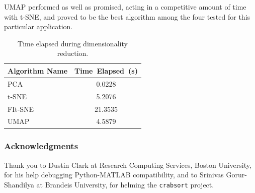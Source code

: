 \documentclass{article}
\begin{document}
UMAP performed as well as promised, acting in a competitive amount of time with t-SNE,
and proved to be the best algorithm among the four tested for this particular application.

\begin{table}
  \caption{Time elapsed during dimensionality reduction.}
  \label{tbl:dim-red-time}
  \centering
  \begin{tabular}{lS}
    \toprule
    Algorithm Name     & Time~Elapsed~(s) \\
    \midrule
    PCA     & 0.0228 \\
    t-SNE   & 5.2076 \\
    FIt-SNE & 21.3535 \\
    UMAP    & 4.5879 \\
    \bottomrule
  \end{tabular}
\end{table}

\subsubsection*{Acknowledgments}

Thank you to Dustin Clark at Research Computing Services, Boston University,
for his help debugging Python-MATLAB compatibility,
and to Srinivas Gorur-Shandilya at Brandeis University,
for helming the \texttt{crabsort} project.
%
%
%

\printbibliography
\end{document}
